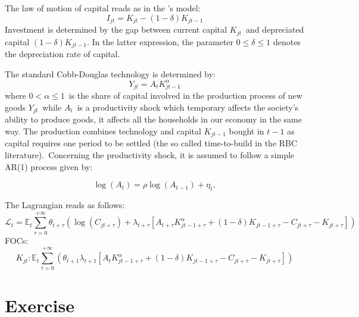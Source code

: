 \documentclass[a4paper,12pt]{article}%
\begin{document}
The law of motion of capital reads as in the \cite{solow1956contribution}'s
model:%
\begin{equation}
I_{jt}=K_{jt}-\left(  1-\delta\right)  K_{jt-1}
\label{eq hh capital law of motion}%
\end{equation}
Investment is determined by the gap between current capital $K_{jt}$\ and
depreciated capital $\left(  1-\delta\right)  K_{jt-1}$. In the latter
expression, the parameter $0\leq\delta\leq1$ denotes the depreciation rate of capital.

The standard Cobb-Douglas technology is determined by:%
\begin{equation}
Y_{jt}=A_{t}K_{jt-1}^{\alpha}\label{eq hh production}%
\end{equation}
where $0<\alpha\leq1$\ is the share of capital involved in the production
process of new goods $Y_{jt}$\ while $A_{t}$\ is a productivity shock which
temporary affects the society's ability to produce goods, it affects all the
households in our economy in the same way. The production combines technology
and capital $K_{jt-1}$ bought in $t-1$ as capital requires one period to be
settled (the so called time-to-build in the RBC literature).\ Concerning the
productivity shock, it is assumed to follow a simple AR(1) process given by:%

\begin{equation}
\log\left(  A_{t}\right)  =\rho\log\left(  A_{t-1}\right)  +\eta_{t},
\end{equation}


The Lagrangian reads as follows:%
\[
\mathcal{L}_{t}=\mathbb{E}_{t}\sum_{\tau=0}^{+\infty}\theta_{t+\tau}\left(
\log\left(  C_{jt+\tau}\right)  +\lambda_{t+\tau}\left[  A_{t+\tau
}K_{jt-1+\tau}^{\alpha}+\left(  1-\delta\right)  K_{jt-1+\tau}-C_{jt+\tau
}-K_{jt+\tau}\right]  \right)
\]
FOCs:%
\[
K_{jt}:\mathbb{E}_{t}\sum_{\tau=0}^{+\infty}\left(  \theta_{t+1}\lambda
_{t+1}\left[  A_{t}K_{jt-1+\tau}^{\alpha}+\left(  1-\delta\right)
K_{jt-1+\tau}-C_{jt+\tau}-K_{jt+\tau}\right]  \right)
\]


\section{Exercise}
\end{document}
